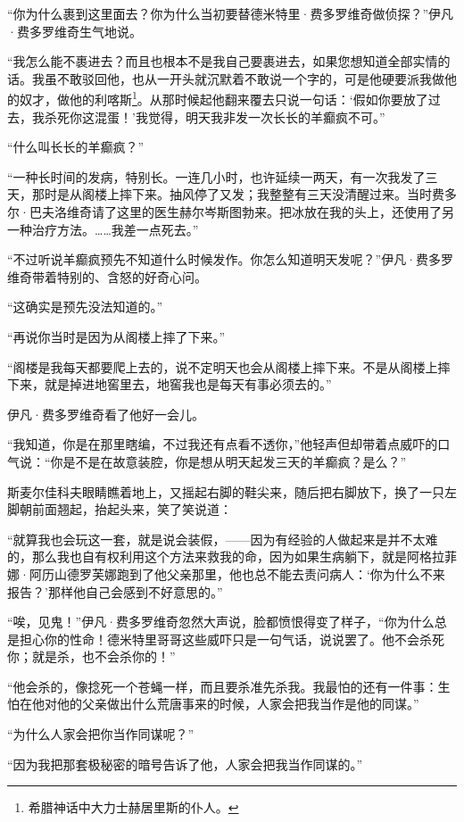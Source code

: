 \par “你为什么裹到这里面去？你为什么当初要替德米特里·费多罗维奇做侦探？”伊凡·费多罗维奇生气地说。
\par “我怎么能不裹进去？而且也根本不是我自己要裹进去，如果您想知道全部实情的话。我虽不敢驳回他，也从一开头就沉默着不敢说一个字的，可是他硬要派我做他的奴才，做他的利喀斯\footnote{希腊神话中大力士赫居里斯的仆人。}。从那时候起他翻来覆去只说一句话：‘假如你要放了过去，我杀死你这混蛋！’我觉得，明天我非发一次长长的羊癫疯不可。”
\par “什么叫长长的羊癫疯？”
\par “一种长时间的发病，特别长。一连几小时，也许延续一两天，有一次我发了三天，那时是从阁楼上摔下来。抽风停了又发；我整整有三天没清醒过来。当时费多尔·巴夫洛维奇请了这里的医生赫尔岑斯图勃来。把冰放在我的头上，还使用了另一种治疗方法。……我差一点死去。”
\par “不过听说羊癫疯预先不知道什么时候发作。你怎么知道明天发呢？”伊凡·费多罗维奇带着特别的、含怒的好奇心问。
\par “这确实是预先没法知道的。”
\par “再说你当时是因为从阁楼上摔了下来。”
\par “阁楼是我每天都要爬上去的，说不定明天也会从阁楼上摔下来。不是从阁楼上摔下来，就是掉进地窖里去，地窖我也是每天有事必须去的。”
\par 伊凡·费多罗维奇看了他好一会儿。
\par “我知道，你是在那里瞎编，不过我还有点看不透你，”他轻声但却带着点威吓的口气说：“你是不是在故意装腔，你是想从明天起发三天的羊癫疯？是么？”
\par 斯麦尔佳科夫眼睛瞧着地上，又摇起右脚的鞋尖来，随后把右脚放下，换了一只左脚朝前面翘起，抬起头来，笑了笑说道：
\par “就算我也会玩这一套，就是说会装假，——因为有经验的人做起来是并不太难的，那么我也自有权利用这个方法来救我的命，因为如果生病躺下，就是阿格拉菲娜·阿历山德罗芙娜跑到了他父亲那里，他也总不能去责问病人：‘你为什么不来报告？’那样他自己会感到不好意思的。”
\par “唉，见鬼！”伊凡·费多罗维奇忽然大声说，脸都愤恨得变了样子，“你为什么总是担心你的性命！德米特里哥哥这些威吓只是一句气话，说说罢了。他不会杀死你；就是杀，也不会杀你的！”
\par “他会杀的，像捻死一个苍蝇一样，而且要杀准先杀我。我最怕的还有一件事：生怕在他对他的父亲做出什么荒唐事来的时候，人家会把我当作是他的同谋。”
\par “为什么人家会把你当作同谋呢？”
\par “因为我把那套极秘密的暗号告诉了他，人家会把我当作同谋的。”
